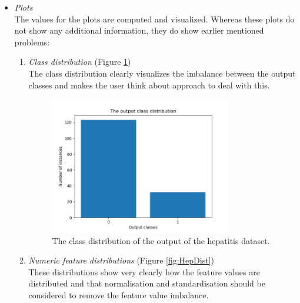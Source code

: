 \documentclass[10pt,a4paper]{article}
\begin{document}
\begin{itemize}
		\item \textit{Plots} \\
		
		The values for the plots are computed and visualized. Whereas these plots do not show any additional information, they do show earlier mentioned problems:
		
		\begin{enumerate}
			\item \textit{Class distribution} (Figure \ref{fig:HepClass})\\
			The class distribution clearly visualizes the imbalance between the output classes and makes the user think about approach to deal with this.
			
			\begin{figure}[H]
				\centering
				\includegraphics[width=0.8\textwidth]{Hep_Class.png}
				\caption{The class distribution of the output of the hepatitis dataset.}
				\label{fig:HepClass}
			\end{figure}
			
			\item \textit{Numeric feature distributions} (Figure \ref{fig:HepDist}) \\
			These distributions show very clearly how the feature values are distributed and that normalisation and standardisation should be considered to remove the feature value imbalance.
			

\end{enumerate}
\end{itemize}
\end{document}
